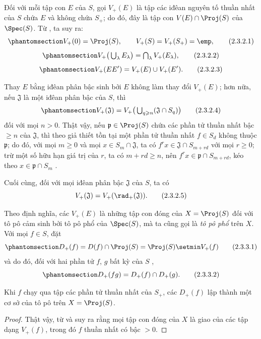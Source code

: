 \documentclass[oneside,10pt]{amsart}
\renewcommand{\geq}{\geqslant}
\newcommand{\oldpage}[2][]{\marginnote{\normalfont\footnotesize\textbf{#1}~|~#2}\ignorespaces}
\let\EGAOriginalLabel\label
\renewcommand{\label}[1]{\phantomsection\EGAOriginalLabel{#1}}
\begin{document}
\begin{env}[2.3.2]
\label{II.2.3.2}
Đối với mỗi tập con $E$ của $S$, gọi $V_+(E)$ là tập các iđêan nguyên tố thuần nhất của $S$ chứa $E$ và không chứa $S_+$; do đó, đây là tập con $V(E)\cap\Proj(S)$ của $\Spec(S)$.
Từ , ta suy ra:
\[
\label{II.2.3.2.1}
  V_+(0)=\Proj(S),\qquad V_+(S)=V_+(S_+)=\emp,
\tag{2.3.2.1}
\]
\[
\label{II.2.3.2.2}
  V_+\big(\textstyle\bigcup_\lambda E_\lambda\big)
  =\textstyle\bigcap_\lambda V_+(E_\lambda),
\tag{2.3.2.2}
\]
\[
\label{II.2.3.2.3}
  V_+(EE')=V_+(E)\cup V_+(E').
\tag{2.3.2.3}
\]

Thay $E$ bằng iđêan phân bậc sinh bởi $E$ không làm thay đổi $V_+(E)$; hơn nữa, nếu $\mathfrak{J}$ là một iđêan phân bậc của $S$, thì
\[
\label{II.2.3.2.4}
  V_+(\mathfrak{J})
  =V_+\big(\textstyle\bigcup_{q\geq n}(\mathfrak{J}\cap S_q)\big)
\tag{2.3.2.4}
\]
\oldpage[II]{26}
đối với mọi $n>0$.
Thật vậy, nếu $\mathfrak{p}\in\Proj(S)$ chứa các phần tử thuần nhất bậc $\geq n$ của $\mathfrak{J}$, thì theo giả thiết tồn tại một phần tử thuần nhất $f\in S_d$ không thuộc $\mathfrak{p}$; do đó, với mọi $m\geq0$ và mọi $x\in S_m\cap\mathfrak{J}$, ta có $f^rx\in\mathfrak{J}\cap S_{m+rd}$ với mọi $r\geq0$; trừ một số hữu hạn giá trị của $r$, ta có $m+rd\geq n$, nên $f^rx\in\mathfrak{p}\cap S_{m+rd}$, kéo theo $x\in\mathfrak{p}\cap S_m$ .

Cuối cùng, đối với mọi iđêan phân bậc $\mathfrak{J}$ của $S$, ta có
\[
  V_+(\mathfrak{J})=V_+(\rad_+(\mathfrak{J})).
\tag{2.3.2.5}
\]
\end{env}

\begin{env}[2.3.3]
\label{II.2.3.3}
Theo định nghĩa, các $V_+(E)$ là những tập con đóng của $X=\Proj(S)$ đối với tô pô cảm sinh bởi tô pô phổ của $\Spec(S)$, mà ta cũng gọi là \emph{tô pô phổ} trên $X$.
Với mọi $f\in S$, đặt
\[
\label{II.2.3.3.1}
  D_+(f)=D(f)\cap\Proj(S)=\Proj(S)\setmin V_+(f)
\tag{2.3.3.1}
\]
và do đó, đối với hai phần tử $f$, $g$ bất kỳ của $S$ ,
\[
\label{II.2.3.3.2}
  D_+(fg)=D_+(f)\cap D_+(g).
\tag{2.3.3.2}
\]
\end{env}

\begin{proposition}[2.3.4]
\label{II.2.3.4}
Khi $f$ chạy qua tập các phần tử thuần nhất của $S_+$, các $D_+(f)$ lập thành một cơ sở của tô pô trên $X=\Proj(S)$.
\end{proposition}

\begin{proof}
Thật vậy, từ  và  suy ra rằng mọi tập con đóng của $X$ là giao của các tập dạng $V_+(f)$, trong đó $f$ thuần nhất có bậc $>0$.
\end{proof}
\end{document}
